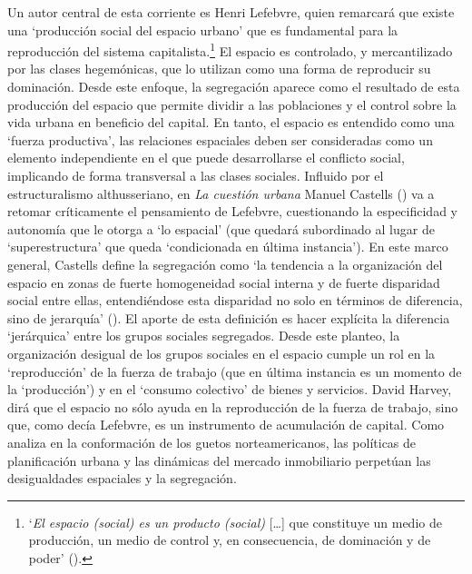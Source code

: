 \documentclass[
  spanish,
  a4paper,%
  chapterprefix=true,%
  DIV=calc,%
  twoside]{scrbook}%
\begin{document}
Un autor central de esta corriente es Henri Lefebvre,
quien remarcará que existe una `producción social del espacio urbano'
que es fundamental para la reproducción del sistema
capitalista.\footnote{`\emph{El espacio (social) es un producto (social)}
  {[}\ldots{]} que constituye un medio de producción, un medio de control y,
  en consecuencia, de dominación y de poder' ().} El espacio es controlado, y
mercantilizado por las clases hegemónicas, que lo utilizan como una
forma de reproducir su dominación. Desde este enfoque, la segregación
aparece como el resultado de esta producción del espacio que permite
dividir a las poblaciones y el control sobre la vida urbana en beneficio
del capital. En tanto, el espacio es entendido como una `fuerza
productiva', las relaciones espaciales deben ser consideradas como un
elemento independiente en el que puede desarrollarse el conflicto
social, implicando de forma transversal a las clases sociales.
Influido por el estructuralismo althusseriano, en \emph{La
cuestión urbana} Manuel Castells () va a retomar
críticamente el pensamiento de Lefebvre, cuestionando la especificidad y
autonomía que le otorga a `lo espacial' (que quedará subordinado al
lugar de `superestructura' que queda `condicionada en última
instancia'). En este marco general, Castells define la segregación como
`la tendencia a la organización del espacio en zonas de fuerte
homogeneidad social interna y de fuerte disparidad social entre ellas,
entendiéndose esta disparidad no solo en términos de diferencia, sino de
jerarquía' (). El aporte de esta definición es
hacer explícita la diferencia `jerárquica' entre los grupos sociales
segregados. Desde este planteo, la organización desigual de los grupos
sociales en el espacio cumple un rol en la `reproducción' de la fuerza
de trabajo (que en última instancia es un momento de la `producción') y
en el `consumo colectivo' de bienes y servicios. David
Harvey, dirá que el espacio no sólo ayuda en la reproducción de la
fuerza de trabajo, sino que, como decía Lefebvre, es un instrumento de
acumulación de capital. Como analiza en la conformación de los guetos
norteamericanos, las políticas de planificación urbana y las dinámicas
del mercado inmobiliario perpetúan las desigualdades espaciales y la
segregación.
\end{document}
